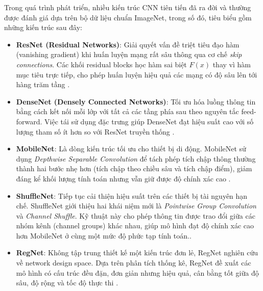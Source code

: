 Trong quá trình phát triển, nhiều kiến trúc CNN tiên tiến đã ra đời và thường được đánh giá dựa trên bộ dữ liệu chuẩn ImageNet, trong số đó, tiêu biểu gồm những kiến trúc sau đây:\vspace{-0.1cm}
\begin{itemize}[label={--}, itemsep=3pt]
    \item \textbf{ResNet (Residual Networks)}: Giải quyết vấn đề triệt tiêu đạo hàm (vanishing gradient) khi huấn luyện mạng rất sâu thông qua cơ chế \textit{skip connections}. Các khối residual blocks học hàm sai biệt $F(x)$ thay vì hàm mục tiêu trực tiếp, cho phép huấn luyện hiệu quả các mạng có độ sâu lên tới hàng trăm tầng \cite{he2015deepresiduallearningimage}.
    
    \item \textbf{DenseNet (Densely Connected Networks)}: Tối ưu hóa luồng thông tin bằng cách kết nối mỗi lớp với tất cả các tầng phía sau theo nguyên tắc feed-forward. Việc tái sử dụng đặc trưng giúp DenseNet đạt hiệu suất cao với số lượng tham số ít hơn so với ResNet truyền thống \cite{huang2018denselyconnectedconvolutionalnetworks}.
    
    \item \textbf{MobileNet}: Là dòng kiến trúc tối ưu cho thiết bị di động. MobileNet sử dụng \textit{Depthwise Separable Convolution} để tách phép tích chập thông thường thành hai bước nhẹ hơn (tích chập theo chiều sâu và tích chập điểm), giảm đáng kể khối lượng tính toán nhưng vẫn giữ được độ chính xác cao \cite{howard2017mobilenetsefficientconvolutionalneural}.

    \item \textbf{ShuffleNet}: Tiếp tục cải thiện hiệu suất trên các thiết bị tài nguyên hạn chế. ShuffleNet giới thiệu hai khái niệm mới là \textit{Pointwise Group Convolution} và \textit{Channel Shuffle}. Kỹ thuật này cho phép thông tin được trao đổi giữa các nhóm kênh (channel groups) khác nhau, giúp mô hình đạt độ chính xác cao hơn MobileNet ở cùng một mức độ phức tạp tính toán.\cite{zhang2017shufflenetextremelyefficientconvolutional}.
    
    \item \textbf{RegNet}: Không tập trung thiết kế một kiến trúc đơn lẻ, RegNet nghiên cứu về network design space. Dựa trên phân tích thống kê, RegNet đề xuất các mô hình có cấu trúc đều đặn, đơn giản nhưng hiệu quả, cân bằng tốt giữa độ sâu, độ rộng và tốc độ thực thi \cite{yokoo2020twostagediscriminativererankinglargescale}.
\end{itemize}